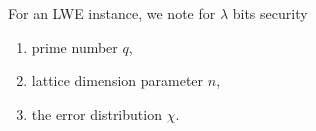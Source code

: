 For an LWE instance, we note for $\lambda$ bits security
\begin{enumerate}
\item prime number $q$,
\item lattice dimension parameter $n$,
\item the error distribution $\chi$.
\end{enumerate}